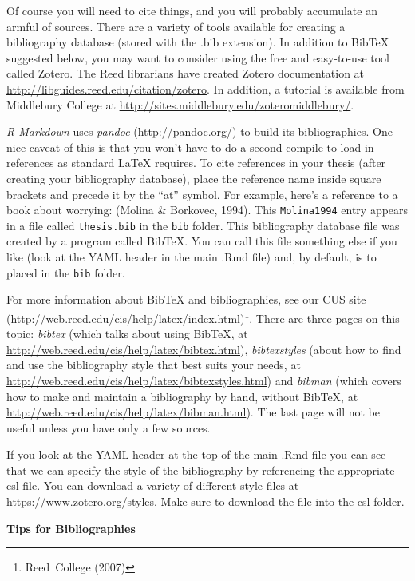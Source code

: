 \documentclass[12pt,twoside]{reedthesis}
\begin{document}
  Of course you will need to cite things, and you will probably accumulate
  an armful of sources. There are a variety of tools available for
  creating a bibliography database (stored with the .bib extension). In
  addition to BibTeX suggested below, you may want to consider using the
  free and easy-to-use tool called Zotero. The Reed librarians have
  created Zotero documentation at
  \url{http://libguides.reed.edu/citation/zotero}. In addition, a tutorial
  is available from Middlebury College at
  \url{http://sites.middlebury.edu/zoteromiddlebury/}.
  
  \emph{R Markdown} uses \emph{pandoc} (\url{http://pandoc.org/}) to build
  its bibliographies. One nice caveat of this is that you won't have to do
  a second compile to load in references as standard LaTeX requires. To
  cite references in your thesis (after creating your bibliography
  database), place the reference name inside square brackets and precede
  it by the ``at'' symbol. For example, here's a reference to a book about
  worrying: (Molina \& Borkovec, 1994). This \texttt{Molina1994} entry
  appears in a file called \texttt{thesis.bib} in the \texttt{bib} folder.
  This bibliography database file was created by a program called BibTeX.
  You can call this file something else if you like (look at the YAML
  header in the main .Rmd file) and, by default, is to placed in the
  \texttt{bib} folder.
  
  For more information about BibTeX and bibliographies, see our CUS site
  (\url{http://web.reed.edu/cis/help/latex/index.html})\footnote{Reed~College
    (2007)}. There are three pages on this topic: \emph{bibtex} (which
  talks about using BibTeX, at
  \url{http://web.reed.edu/cis/help/latex/bibtex.html}),
  \emph{bibtexstyles} (about how to find and use the bibliography style
  that best suits your needs, at
  \url{http://web.reed.edu/cis/help/latex/bibtexstyles.html}) and
  \emph{bibman} (which covers how to make and maintain a bibliography by
  hand, without BibTeX, at
  \url{http://web.reed.edu/cis/help/latex/bibman.html}). The last page
  will not be useful unless you have only a few sources.
  
  If you look at the YAML header at the top of the main .Rmd file you can
  see that we can specify the style of the bibliography by referencing the
  appropriate csl file. You can download a variety of different style
  files at \url{https://www.zotero.org/styles}. Make sure to download the
  file into the csl folder.
  
  \textbf{Tips for Bibliographies}
  
\end{document}
